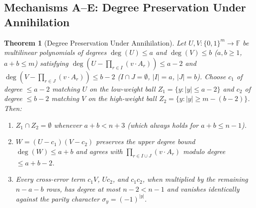 \documentclass[11pt,a4paper]{article}
\newtheorem{theorem}{Theorem}[section]
\newcommand{\wt}[1]{|#1|}
\begin{document}
\subsection{Mechanisms A--E: Degree Preservation Under Annihilation}

\begin{theorem}[Degree Preservation Under Annihilation]
\label{thm:deg_pres}
Let $U, V : \{0,1\}^m \to \mathbb{F}$ be multilinear polynomials of degrees $\deg(U) \le a$ and $\deg(V) \le b$ ($a, b \ge 1$, $a + b \le m$) satisfying $\deg(U - \prod_{r \in I} (v \cdot A_r)) \le a - 2$ and $\deg(V - \prod_{r \in J} (v \cdot A_r)) \le b - 2$ ($I \cap J = \emptyset$, $\wt{I} = a$, $\wt{J} = b$). Choose $c_1$ of degree $\le a - 2$ matching $U$ on the low-weight ball $Z_1 = \{y : \wt{y} \le a - 2\}$ and $c_2$ of degree $\le b - 2$ matching $V$ on the high-weight ball $Z_2 = \{y : \wt{y} \ge m - (b - 2)\}$. Then:
\begin{enumerate}
  \item $Z_1 \cap Z_2 = \emptyset$ whenever $a + b < n + 3$ (which always holds for $a + b \le n - 1$).
  \item $W = (U - c_1)(V - c_2)$ preserves the upper degree bound $\deg(W) \le a + b$ and agrees with $\prod_{r \in I \cup J} (v \cdot A_r)$ modulo degree $\le a + b - 2$.
  \item Every cross-error term $c_1 V$, $U c_2$, and $c_1 c_2$, when multiplied by the remaining $n - a - b$ rows, has degree at most $n - 2 < n - 1$ and vanishes identically against the parity character $\sigma_y = (-1)^{\wt{y}}$.
\end{enumerate}
\end{theorem}
\end{document}

